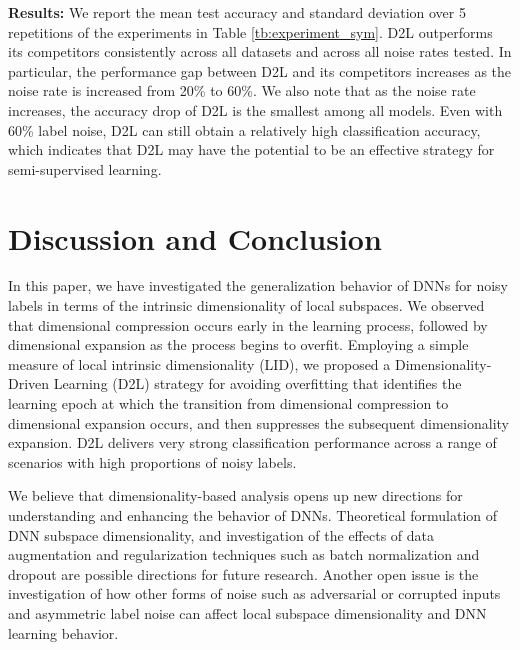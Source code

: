 \documentclass{article}
\begin{document}
\textbf{Results:} We report the mean test accuracy and standard deviation over 5 repetitions of the experiments
in Table \ref{tb:experiment_sym}. D2L outperforms its competitors consistently across all datasets and across all noise rates tested. In particular, the performance gap between D2L and its competitors increases as the noise rate is increased from 20\% to 60\%. We also note that as the noise rate increases, the accuracy drop of D2L is the smallest among all models. Even with 60\% label noise, D2L can still obtain a relatively high classification accuracy, which indicates that D2L may have the potential to be an effective strategy for semi-supervised learning. 



\section{Discussion and Conclusion}
In this paper, we have investigated the generalization behavior of DNNs for noisy labels in terms of the intrinsic dimensionality of local subspaces. We observed that dimensional compression occurs early in the learning process, followed by dimensional expansion as the process begins to overfit. Employing a simple measure of local intrinsic dimensionality (LID), we proposed a Dimensionality-Driven Learning (D2L) strategy for avoiding overfitting that identifies the learning epoch at which the transition from dimensional compression to dimensional expansion occurs, and then suppresses the subsequent dimensionality expansion. D2L delivers very strong classification performance across a range of scenarios with high proportions of noisy labels.   

We believe that dimensionality-based analysis opens up new directions for understanding and enhancing the behavior of DNNs.
Theoretical formulation of DNN subspace dimensionality, and investigation of the effects of data augmentation and regularization techniques such as batch normalization \cite{ioffe2015batch} and dropout \cite{srivastava2014dropout} are possible directions for future research.  
%
Another open issue is the investigation of how other forms of noise such as adversarial or corrupted inputs and asymmetric label noise
can affect local subspace dimensionality and DNN learning behavior.
\end{document}
